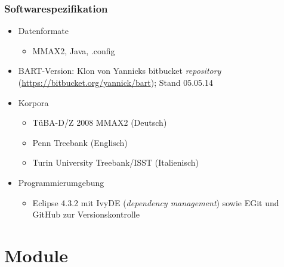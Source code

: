 \documentclass[11pt,a4paper]{beamer}
\begin{document}
\begin{frame}
\frametitle{Softwarespezifikation}

\begin{itemize}

	\item Datenformate
		\begin{itemize}
		\item MMAX2, Java, .config
	\end{itemize}
	\item BART-Version: Klon von Yannicks bitbucket \textit{repository} (\url{https://bitbucket.org/yannick/bart}); Stand 05.05.14 
	\item Korpora
	\begin{itemize}
		\item TüBA-D/Z 2008 MMAX2 (Deutsch)
		\item Penn Treebank (Englisch)
		\item Turin University Treebank/ISST (Italienisch)
	\end{itemize}
	\item Programmierumgebung
	\begin{itemize}
		\item Eclipse 4.3.2 mit IvyDE (\textit{dependency management}) sowie EGit und GitHub zur Versionskontrolle
	\end{itemize}

\end{itemize}

\end{frame}
\section{Module}
\end{document}
